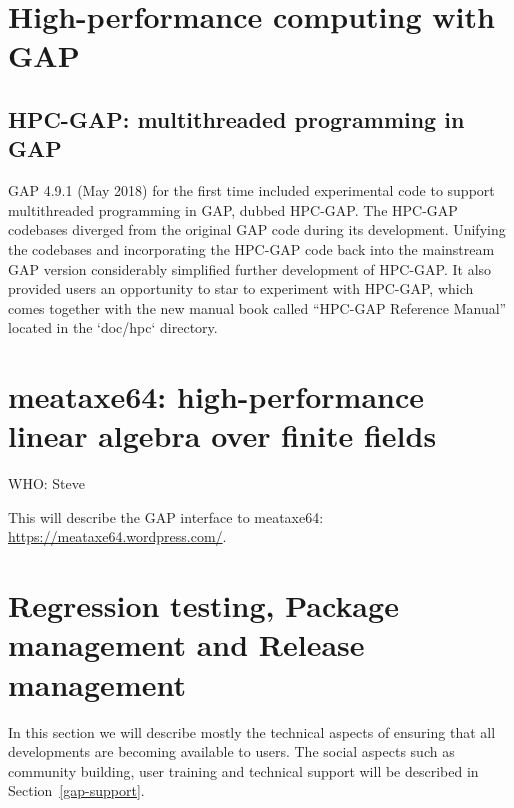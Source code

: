 \documentclass{deliverablereport}
\begin{document}
\section{High-performance computing with GAP}\label{hpc}

\subsection{HPC-GAP: multithreaded programming in GAP}\label{hpc-gap}

GAP 4.9.1 (May 2018) for the first time included experimental code to 
support multithreaded programming in GAP, dubbed HPC-GAP. The HPC-GAP 
codebases diverged from the original GAP code during its development. 
Unifying the codebases and incorporating the HPC-GAP code back into the 
mainstream GAP version considerably simplified further development of 
HPC-GAP. It also provided users an opportunity to star to experiment 
with HPC-GAP, which comes together with the new manual book called 
``HPC-GAP Reference Manual'' located in the `doc/hpc` directory.




\section{meataxe64: high-performance linear algebra over finite fields}\label{meataxe64}

WHO: Steve

This will describe the GAP interface to meataxe64: \url{https://meataxe64.wordpress.com/}.


\section{Regression testing, Package management and Release management}\label{gap-infra}

In this section we will describe mostly the technical aspects of
ensuring that all developments are becoming available to users.
The social aspects such as community building, user training
and technical support will be described in Section~\ref{gap-support}.
\end{document}
